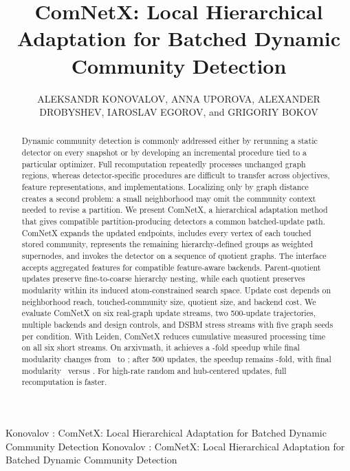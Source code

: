 \documentclass{ieeeaccess}
\begin{document}
\history{}
\doi{}
\vol{}
\year{}

\title{ComNetX: Local Hierarchical Adaptation for Batched Dynamic Community Detection}

\author{\uppercase{Aleksandr Konovalov},
\uppercase{Anna Uporova},
\uppercase{Alexander Drobyshev},
\uppercase{Iaroslav Egorov}, and
\uppercase{Grigoriy Bokov}}

\address[1]{AI Research Center, Lomonosov Moscow State University,
1 Leninskie Gory, Moscow 119991, Russian Federation}


\markboth
{Konovalov \headeretal: ComNetX: Local Hierarchical Adaptation for Batched Dynamic Community Detection}
{Konovalov \headeretal: ComNetX: Local Hierarchical Adaptation for Batched Dynamic Community Detection}

\begin{abstract}
Dynamic community detection is commonly addressed either by rerunning a static
detector on every snapshot or by developing an incremental procedure tied to a
particular optimizer. Full recomputation repeatedly processes unchanged graph
regions, whereas detector-specific procedures are difficult to transfer across
objectives, feature representations, and implementations. Localizing only by
graph distance creates a second problem: a small neighborhood may omit the
community context needed to revise a partition. We present ComNetX, a
hierarchical adaptation method that gives compatible partition-producing
detectors a common batched-update path. ComNetX expands the updated endpoints,
includes every vertex of each touched stored community, represents the
remaining hierarchy-defined groups as weighted supernodes, and invokes the
detector on a sequence of quotient graphs. The interface accepts aggregated
features for compatible feature-aware backends. Parent-quotient updates
preserve fine-to-coarse hierarchy nesting, while each quotient preserves
modularity within its induced atom-constrained search space. Update cost
depends on neighborhood reach, touched-community size, quotient size, and
backend cost. We evaluate ComNetX
on six real-graph update streams, two 500-update trajectories, multiple backends and design
controls, and DSBM stress streams with five graph seeds per condition. With
Leiden, ComNetX reduces cumulative measured processing time on all six short
streams. On arxivmath, it achieves a \ArxivShortSpeedup-fold speedup while
final modularity changes from \ArxivShortFullQ\ to \ArxivShortLocalQ; after
500 updates, the speedup remains \ArxivLongSpeedup-fold, with final modularity
\ArxivLongLocalQ\ versus \ArxivLongFullQ. For high-rate random and
hub-centered updates, full recomputation is faster.
\end{abstract}
\end{document}
